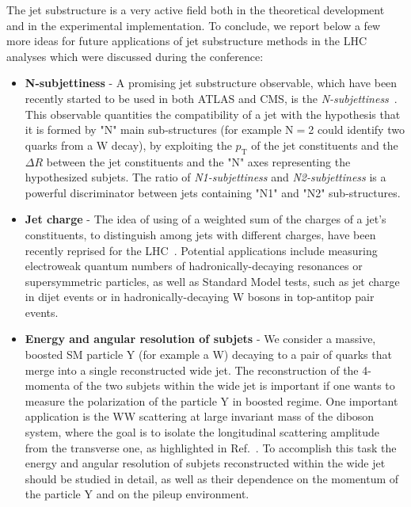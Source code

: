 \documentclass{PoS}
\begin{document}
The jet substructure is a very active field both in the theoretical development and in the experimental implementation.
To conclude, we report below a few more ideas for future applications of jet substructure methods in the LHC analyses which 
were discussed during the conference:
\begin{itemize}
\item {\bf N-subjettiness} - A promising jet substructure observable, which have been recently started to be used in both
ATLAS and CMS, is the {\it N-subjettiness}~\cite{Stewart:2010tn,Thaler:2010tr,Thaler:2011gf}. 
This observable quantities the compatibility of a jet with the hypothesis that it is 
formed by "N" main sub-structures (for example N$=$2 could identify two quarks from a W decay), 
by exploiting the $p_\mathrm{T}$ of the jet constituents and the $\Delta R$ between the jet constituents and 
the "N" axes representing the hypothesized subjets. The ratio of 
{\it N1-subjettiness} and {\it N2-subjettiness} is a powerful discriminator between jets containing "N1" and "N2" sub-structures. 
\item  {\bf Jet charge} - The idea of using of a weighted sum of the charges of a jet's constituents, to distinguish 
among jets with different charges, have been recently reprised for the LHC~\cite{Krohn:2012fg}.
Potential applications include measuring electroweak quantum
numbers of hadronically-decaying resonances or supersymmetric particles, as well as 
Standard Model tests, such as jet charge in dijet events or in hadronically-decaying W 
bosons in top-antitop pair events.
\item {\bf Energy and angular resolution of subjets} - We consider a massive, boosted SM particle Y (for example a W) 
decaying to a pair of quarks that merge into a single reconstructed wide jet. 
The reconstruction of the 4-momenta of the two subjets within the wide jet is important if one wants to 
measure the polarization of the particle Y in boosted regime. One important application is the WW scattering 
at large invariant mass of the diboson system, where the goal is to isolate the longitudinal scattering 
amplitude from the transverse one, as highlighted in Ref.~\cite{Han:2009em}.
To accomplish this task the energy and angular resolution of subjets reconstructed within the wide jet 
should be studied in detail, as well as their dependence on the momentum of the particle Y and on the pileup environment. 
\end{itemize}
\end{document}
